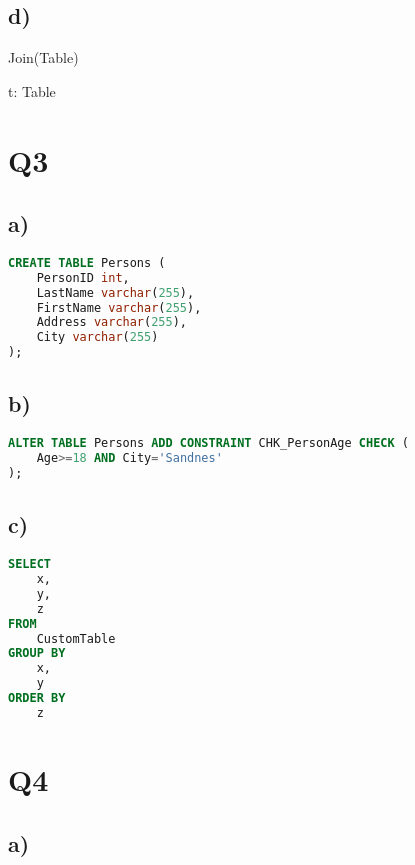 \documentclass{article}
\begin{document}
\subsection*{\small d)}

\begin{zed}
Join(Table)
\end{zed}

\begin{zed}
\forall t: Table
\end{zed}

\pagebreak 
\section*{Q3}

\subsection*{\small a)}

\begin{lstlisting}[language=sql]
CREATE TABLE Persons (
    PersonID int,
    LastName varchar(255),
    FirstName varchar(255),
    Address varchar(255),
    City varchar(255)
);
\end{lstlisting}


\subsection*{\small b)}

\begin{lstlisting}[language=sql]
ALTER TABLE Persons ADD CONSTRAINT CHK_PersonAge CHECK (
    Age>=18 AND City='Sandnes'
);
\end{lstlisting}

\subsection*{\small c)}

\begin{lstlisting}[language=sql]
SELECT 
    x,
    y,
    z
FROM 
    CustomTable 
GROUP BY 
    x,
    y
ORDER BY
    z
\end{lstlisting}

\pagebreak 
\section*{Q4}

\subsection*{\small a)}
\end{document}
